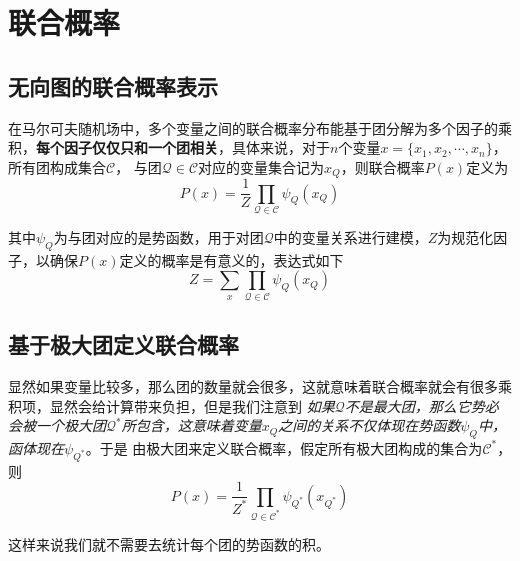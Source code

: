 \section{联合概率}

\subsection*{无向图的联合概率表示}

在马尔可夫随机场中，多个变量之间的联合概率分布能基于团分解为多个因子的乘积，\textbf{每个因子仅仅只和一个团相关}，具体来说，对于$n$个变量$x=\{x_1,x_2,\cdots,x_n\}$，所有团构成集合$\mathcal{C}$，
与团$\mathcal{Q}\in \mathcal{C}$对应的变量集合记为$x_Q$，则联合概率$P(x)$定义为
\begin{equation}
    P(x)=\frac{1}{Z}\prod\limits_{\mathcal{Q}\in \mathcal{C}}\psi_Q(x_Q)
\end{equation}

其中$\psi_Q$为与团对应的是势函数，用于对团$\mathcal{Q}$中的变量关系进行建模，$Z$为规范化因子，以确保$P(x)$定义的概率是有意义的，表达式如下
\begin{equation}
    Z=\sum_{x}\prod_{\mathcal{Q}\in \mathcal{C}}\psi_Q(x_Q)
\end{equation}

\subsection*{基于极大团定义联合概率}

显然如果变量比较多，那么团的数量就会很多，这就意味着联合概率就会有很多乘积项，显然会给计算带来负担，但是我们注意到
\textsl{如果$\mathcal{Q}$不是最大团，那么它势必会被一个极大团$\mathcal{Q}^*$所包含，这意味着变量$x_Q$之间的关系不仅体现在势函数$\psi_Q$中，函体现在$\psi_{Q^*}$}。于是
由极大团来定义联合概率，假定所有极大团构成的集合为$\mathcal{C}^*$，则
\begin{equation}
    P(x)=\frac{1}{Z^*}\prod\limits_{\mathcal{Q}\in \mathcal{C}^*}\psi_{Q^*}(x_{Q^*})
\end{equation}

这样来说我们就不需要去统计每个团的势函数的积。

